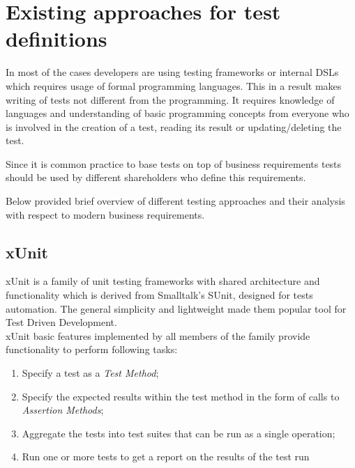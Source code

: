 
\section{Existing approaches for test definitions}
In most of the cases developers are using testing frameworks or internal DSLs which requires usage of formal programming languages. This in a result makes writing of tests not different from the programming. It requires knowledge of languages and understanding of basic programming concepts from everyone who is involved in the creation of a test, reading its result or updating/deleting the test.

Since it is common practice to base tests on top of business requirements tests should be used by different shareholders who define this requirements.

Below provided brief overview of different testing approaches and their analysis with respect to modern business requirements.

\subsection{xUnit}
xUnit is a family of unit testing frameworks with shared architecture and functionality which is derived from Smalltalk's SUnit, designed for tests automation\cite{xunit}\cite{xunitFowler}. The general simplicity and lightweight made them popular tool for Test Driven Development\cite{xunitFowler}. \\

xUnit basic features implemented by all members of the family provide functionality to perform following tasks\cite{xunit}:
\begin{enumerate}
	\item Specify a test as a \textit{Test Method};
	\item Specify the expected results within the test method in the form of calls to \textit{Assertion Methods};
	\item Aggregate the tests into test suites that can be run as a single operation;
	\item Run one or more tests to get a report on the results of the test run
\end{enumerate}

